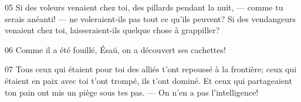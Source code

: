 
05 Si des voleurs venaient chez toi, des pillards pendant la nuit, --- comme tu serais anéanti! ---  ne voleraient-ils pas tout ce qu’ils peuvent? Si des vendangeurs venaient chez toi, laisseraient-ils quelque chose à grappiller?

06 Comme il a été fouillé, Ésaü, on a découvert ses cachettes!

07 Tous ceux qui étaient pour toi des alliés t’ont repoussé à la frontière; ceux qui étaient en paix avec toi t’ont trompé, ils t’ont dominé. Et ceux qui partageaient ton pain ont mis un piège sous tes pas. --- On n’en a pas l’intelligence!
